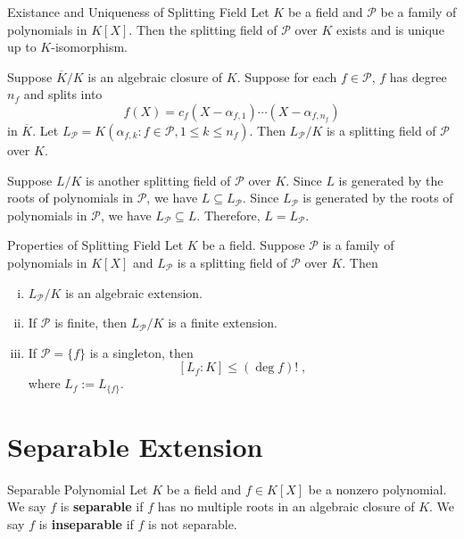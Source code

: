 \begin{proposition}{Existance and Uniqueness of Splitting Field}{}
    Let $K$ be a field and $\mathcal{P}$ be a family of polynomials in $K[X]$. Then the splitting field of $\mathcal{P}$ over $K$ exists and is unique up to $K$-isomorphism.
\end{proposition}
\begin{prf}
    Suppose $\overline{K}/K$ is an algebraic closure of $K$. Suppose for each $f\in \mathcal{P}$, $f$ has degree $n_f$ and splits into
    \[
    f(X)=c_f(X-\alpha_{f,1})\cdots(X-\alpha_{f,n_f})
    \]
    in $\overline{K}$. Let $L_\mathcal{P}=K(\alpha_{f,k}:f\in \mathcal{P}, 1\le k\le n_f)$. Then $L_\mathcal{P}/K$ is a splitting field of $\mathcal{P}$ over $K$. 
    
    Suppose $L/K$ is another splitting field of $\mathcal{P}$ over $K$. Since $L$ is generated by the roots of polynomials in $\mathcal{P}$, we have $L\subseteq L_\mathcal{P}$. Since $L_\mathcal{P}$ is generated by the roots of polynomials in $\mathcal{P}$, we have $L_\mathcal{P}\subseteq L$. Therefore, $L=L_\mathcal{P}$.
\end{prf}

\begin{proposition}{Properties of Splitting Field}{}
    Let $K$ be a field. Suppose $\mathcal{P}$ is a family of polynomials in $K[X]$ and $L_\mathcal{P}$ is a splitting field of $\mathcal{P}$ over $K$. Then
    \begin{enumerate}[(i)]
        \item $L_\mathcal{P}/K$ is an algebraic extension.
        \item If $\mathcal{P}$ is finite, then $L_\mathcal{P}/K$ is a finite extension.
        \item If $\mathcal{P}=\{f\}$ is a singleton, then
        \[
        \left[L_f:K\right]\le\left(\deg f\right)!\;,
        \]
        where $L_f:=L_{\{f\}}$.
    \end{enumerate}
\end{proposition}

    

\section{Separable Extension}
\begin{definition}{Separable Polynomial}
    Let $K$ be a field and $f\in K[X]$ be a nonzero polynomial. We say $f$ is \textbf{separable} if $f$ has no multiple roots in an algebraic closure of $K$. We say $f$ is \textbf{inseparable} if $f$ is not separable.
\end{definition}

